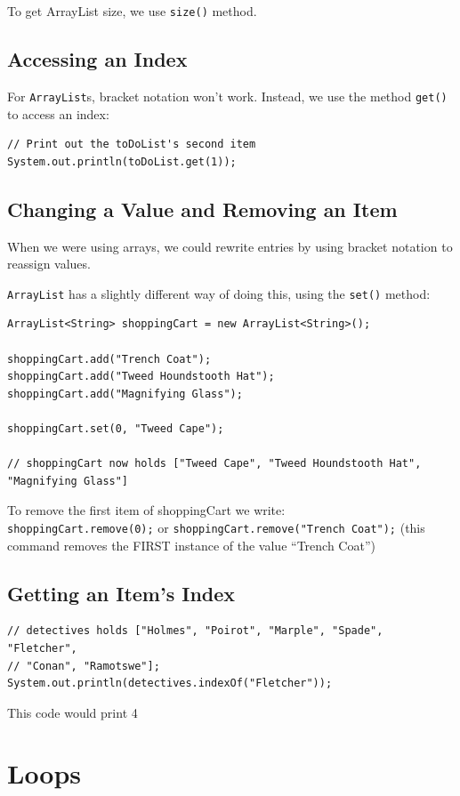 \documentclass[a4paper, 12pt]{article}
\begin{document}
To get ArrayList size, we use \verb|size()| method.

\subsection{Accessing an Index}
For \verb|ArrayList|s, bracket notation won't work. Instead, we use the method \verb|get()| to access an index:
\begin{verbatim}
// Print out the toDoList's second item
System.out.println(toDoList.get(1));
\end{verbatim}

\subsection{Changing a Value and Removing an Item}
When we were using arrays, we could rewrite entries by using bracket notation to reassign values.

\verb|ArrayList| has a slightly different way of doing this, using the \verb|set()| method:
\begin{verbatim}
ArrayList<String> shoppingCart = new ArrayList<String>();

shoppingCart.add("Trench Coat");
shoppingCart.add("Tweed Houndstooth Hat");
shoppingCart.add("Magnifying Glass");

shoppingCart.set(0, "Tweed Cape");

// shoppingCart now holds ["Tweed Cape", "Tweed Houndstooth Hat", "Magnifying Glass"]
\end{verbatim}

To remove the first item of shoppingCart we write:\\
\verb|shoppingCart.remove(0);| or \verb|shoppingCart.remove("Trench Coat");| (this command removes the FIRST instance of the value ``Trench Coat'')

\subsection{Getting an Item's Index}
\begin{verbatim}
// detectives holds ["Holmes", "Poirot", "Marple", "Spade", "Fletcher", 
// "Conan", "Ramotswe"];
System.out.println(detectives.indexOf("Fletcher"));
\end{verbatim}
This code would print 4


\section{Loops}
\end{document}
